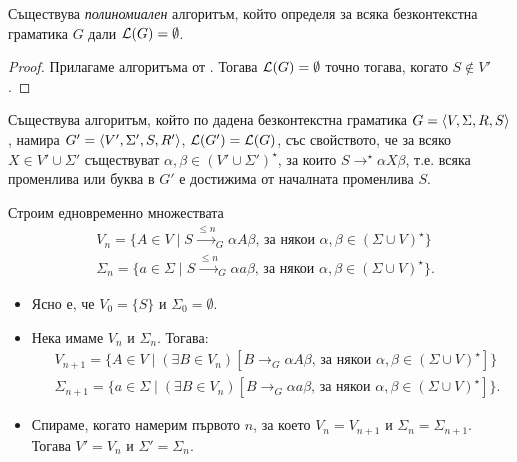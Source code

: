 \begin{framed}
  \begin{cor}
    Съществува {\em полиномиален} алгоритъм, който определя за всяка безконтекстна граматика $G$ дали $\mathcal{L}(G) = \emptyset$.
  \end{cor}  
\end{framed}
\begin{proof}
  Прилагаме алгоритъма от .
  Тогава $\mathcal{L}(G) = \emptyset$ точно тогава, когато $S \not\in V'$.  
\end{proof}

\begin{lemma}
  \label{lem:useless2}
  Съществува алгоритъм, който по дадена безконтекстна граматика $G = \langle{V,\Sigma,R,S}\rangle$, намира $G' = \langle{V',\Sigma',S,R'}\rangle$, $\mathcal{L}(G') = \mathcal{L}(G)$,
  със свойството, че за всяко $X \in V' \cup \Sigma'$ съществуват $\alpha, \beta \in (V'\cup\Sigma')^\star$,
  за които $S \to^\star \alpha X \beta$,
  т.е. всяка променлива или буква в $G'$ е достижима от началната променлива $S$.
\end{lemma}
\begin{hint}
  Строим едновременно множествата
  \begin{align*}
    & V_n = \{A \in V \mid S \stackrel{\leq n}{\to}_G \alpha A \beta\text{, за някои }\alpha,\beta \in (\Sigma \cup V)^\star\}\\
    & \Sigma_n = \{a \in \Sigma \mid S \stackrel{\leq n}{\to}_G \alpha a \beta\text{, за някои }\alpha,\beta \in (\Sigma\cup V)^\star\}.
  \end{align*}
  \begin{itemize}
  \item
    Ясно е, че $V_0 = \{S\}$ и $\Sigma_0 = \emptyset$.
  \item
    Нека имаме $V_n$ и $\Sigma_n$. Тогава:
    \begin{align*}
      & V_{n+1} = \{A \in V \mid (\exists B \in V_n)[ B \to_G \alpha A \beta\text{, за някои }\alpha,\beta \in (\Sigma\cup V)^\star]\}\\
      & \Sigma_{n+1} = \{a \in \Sigma \mid (\exists B \in V_n)[ B \to_G \alpha a \beta\text{, за някои }\alpha,\beta \in (\Sigma\cup V)^\star]\}.
    \end{align*}
  \item
    Спираме, когато намерим първото $n$, за което $V_n = V_{n+1}$ и $\Sigma_n = \Sigma_{n+1}$.
    Тогава $V' = V_n$ и $\Sigma' = \Sigma_n$.
  \end{itemize}
\end{hint}

